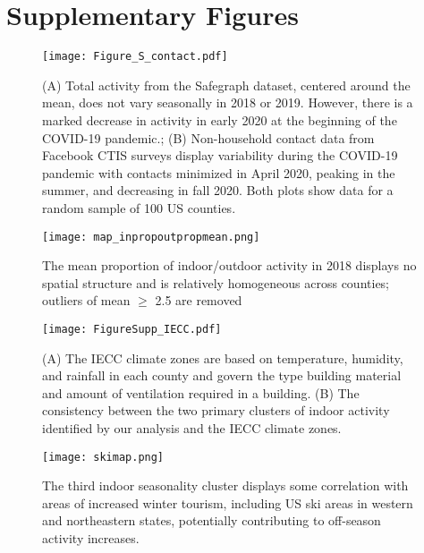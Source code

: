 \documentclass{article}
\begin{document}



\renewcommand{\thefigure}{S\arabic{figure}}
\renewcommand{\thetable}{S\arabic{table}}
\setcounter{figure}{0}    
\setcounter{table}{0} 
\setcounter{section}{0}
\pagebreak

\section*{Supplementary Figures}

\begin{figure}[h!]
    \centering
    \texttt{[image: Figure\_S\_contact.pdf]}
    \caption{(A) Total activity from the Safegraph dataset, centered around the mean, does not vary seasonally in 2018 or 2019. However, there is a marked decrease in activity in early 2020 at the beginning of the COVID-19 pandemic.; (B) Non-household contact data from Facebook CTIS surveys display variability during the COVID-19 pandemic with contacts minimized in April 2020, peaking in the summer, and decreasing in fall 2020. Both plots show data for a random sample of 100 US counties.}
    \label{fig:contactnotseasonal}
\end{figure}

\begin{figure}[h!]
    \centering
    \texttt{[image: map\_inpropoutpropmean.png]}
    \caption{The mean proportion of indoor/outdoor activity in 2018 displays no spatial structure and is relatively homogeneous across counties; outliers  of mean $\geq$ 2.5 are removed}
    \label{fig:indooroutdoormean}
\end{figure}


\begin{figure}[h!]
    \centering
    \texttt{[image: FigureSupp\_IECC.pdf]}
    \caption{(A) The IECC climate zones are based on temperature, humidity, and rainfall in each county and govern the type building material and amount of ventilation required in a building. (B) The consistency between the two primary clusters of indoor activity identified by our analysis and the IECC climate zones.}
    \label{fig:iecc}
\end{figure}

\begin{figure}[h!]
    \centering
    \texttt{[image: skimap.png]}
    \caption{The third indoor seasonality cluster displays some correlation with areas of increased winter tourism, including US ski areas in western and northeastern states, potentially contributing to off-season activity increases.}
    \label{fig:ski}
\end{figure}
\end{document}
